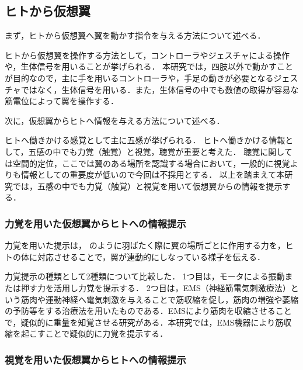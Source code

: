     \subsection{ヒトから仮想翼}
    まず，ヒトから仮想翼へ翼を動かす指令を与える方法について述べる．

    ヒトから仮想翼を操作する方法として，コントローラやジェスチャによる操作や，生体信号を用いることが挙げられる．
    本研究では，四肢以外で動かすことが目的なので，主に手を用いるコントローラや，手足の動きが必要となるジェスチャではなく，生体信号を用いる．また，生体信号の中でも数値の取得が容易な筋電位によって翼を操作する．


    
    次に，仮想翼からヒトへ情報を与える方法について述べる．

    ヒトへ働きかける感覚として主に五感が挙げられる．
    ヒトへ働きかける情報として，五感の中でも力覚（触覚）と視覚，聴覚が重要と考えた．
    聴覚に関しては空間的定位，ここでは翼のある場所を認識する場合において，一般的に視覚よりも情報としての重要度が低い\cite{岡嶋克典20182}ので今回は不採用とする．
    以上を踏まえて本研究では，五感の中でも力覚（触覚）と視覚を用いて仮想翼からの情報を提示する．

    \subsubsection{力覚を用いた仮想翼からヒトへの情報提示}

    力覚を用いた提示は，
    のように羽ばたく際に翼の場所ごとに作用する力を，ヒトの体に対応させることで，翼が連動的にしなっている様子を伝える．

    力覚提示の種類として2種類について比較した．
    1つ目は，モータによる振動または押す力を活用し力覚を提示する．
    2つ目は，EMS（神経筋電気刺激療法）という筋肉や運動神経へ電気刺激を与えることで筋収縮を促し，筋肉の増強や萎縮の予防等をする治療法を用いたものである．EMSにより筋肉を収縮させることで，疑似的に重量を知覚させる研究がある\cite{小川剛史2017電気的筋肉刺激が重量知覚に及ぼす影響の分析}．本研究では，EMS機器により筋収縮を起こすことで疑似的に力覚を提示する．
    
    \subsubsection{視覚を用いた仮想翼からヒトへの情報提示}
 

